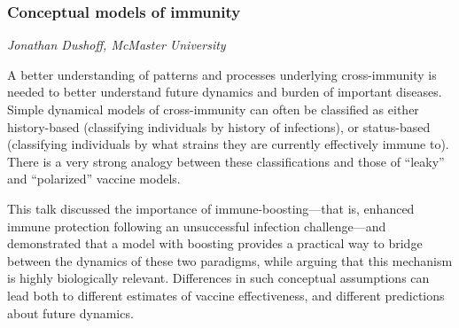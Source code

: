 \subsubsection*{Conceptual models of immunity}
\textit{Jonathan Dushoff, McMaster University}

A better understanding of patterns and processes underlying
cross-immunity is needed to better understand future dynamics and
burden of important diseases. Simple dynamical models of
cross-immunity can often be classified as either history-based
(classifying individuals by history of infections), or status-based
(classifying individuals by what strains they are currently
effectively immune to). There is a very strong analogy between these
classifications and those of “leaky” and “polarized” vaccine models.

This talk discussed the importance of immune-boosting---that is,
enhanced immune protection following an unsuccessful infection
challenge---and demonstrated that a model with boosting provides a
practical way to bridge between the dynamics of these two paradigms,
while arguing that this mechanism is highly biologically relevant.
Differences in such conceptual assumptions can lead both to different
estimates of vaccine effectiveness, and different predictions about
future dynamics.
